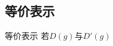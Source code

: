 
\begin{issues}
\issueDraft
\end{issues}

\subsection{等价表示}
\begin{definition}{等价表示}
若$D(g)$与$D'(g)$
\end{definition}